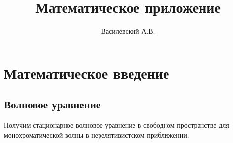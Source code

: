\documentclass[12pt,a4paper]{article}
\title{Математическое приложение}
\author{Василевский А.В.}
\begin{document}
    \maketitle
    \tableofcontents

    \appendix

    \section{Математическое введение}


    \subsection{Волновое уравнение}

        Получим стационарное волновое уравнение в свободном пространстве для монохроматической волны в нерелятивистском приближении.
\end{document}
